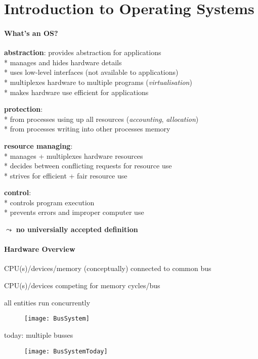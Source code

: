 \section{Introduction to Operating Systems}

\paragraph{What's an OS?}
\begin{items}
	\item \textbf{abstraction}: provides abstraction for applications \\*
		manages and hides hardware details \\*
		uses low-level interfaces (not available to applications) \\*
		multiplexes hardware to multiple programs (\emph{virtualisation}) \\*
		makes hardware use efficient for applications
	\item \textbf{protection}: \\*
		from processes using up all resources (\emph{accounting}, \emph{allocation}) \\*
		from processes writing into other processes memory
	\item \textbf{resource managing}: \\*
		manages + multiplexes hardware resources \\*
		decides between conflicting requests for resource use \\*
		strives for efficient + fair resource use
	\item \textbf{control}: \\*
		controls program execution \\*
		prevents errors and improper computer use
	\item \( \leadsto \) \textbf{no universially accepted definition}
\end{items}

\paragraph{Hardware Overview}
\begin{items}
	\item CPU(s)/devices/memory (conceptually) connected to common bus
	\item CPU(s)/devices competing for memory cycles/bus
	\item all entities run concurrently
	\begin{figure}[H]\centering\label{BusSystem}\texttt{[image: BusSystem]}\end{figure}
	\item today: multiple busses
	\begin{figure}[H]\centering\label{BusSystemToday}\texttt{[image: BusSystemToday]}\end{figure}
\end{items}

